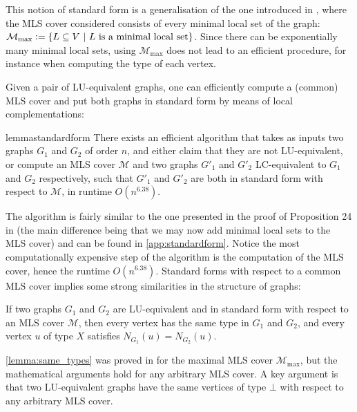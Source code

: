 \documentclass[a4paper,UKenglish,cleveref,autoref,thm-restate]{arxiv}
\newcommand{\defeq}{\vcentcolon=}
\newcommand{\se}{\subseteq}
\begin{document}
\begin{remark}This notion of standard form is a generalisation of the one introduced in \cite{claudet2024local}, where the MLS cover considered consists of every minimal local set of the graph: $\mathcal M_\text{max} \defeq \{L \se V ~|~ L \text{~is a minimal local set}\}$. Since there can be exponentially many minimal local sets, using $\mathcal M_\text{max}$ does not lead to an efficient procedure, for instance when computing the type of each vertex.
\end{remark}

Given a pair of LU-equivalent graphs, one can efficiently compute a (common) MLS cover and put both graphs in standard form by means of local complementations:

\begin{restatable}{lemma}{standardform} \label{lemma:standardform}
    There exists an efficient algorithm that takes as inputs two graphs $G_1$ and $G_2$ of order $n$, and either claim that they are not LU-equivalent, or compute an MLS cover $\mathcal M$ and two graphs $G'_1$ and $G'_2$ LC-equivalent to $G_1$ and $G_2$ respectively, such that $G'_1$ and $G'_2$ are both in standard form with respect to $\mathcal M$, in runtime $O(n^{6.38})$.
\end{restatable}

The algorithm is fairly similar to the one presented in the proof of Proposition 24 in \cite{claudet2024local} (the main difference being that we may now add minimal local sets to the MLS cover) and can be found in \cref{app:standardform}. Notice the most computationally expensive step of the algorithm is the computation of the MLS cover, hence the runtime $O(n^{6.38})$. Standard forms with respect to a common MLS cover implies some strong similarities in the structure of graphs:

\begin{lemma} \label{lemma:same_types}
    If two graphs $G_1$ and $G_2$ are LU-equivalent and in standard form with respect to an MLS cover $\mathcal M$, then every vertex has the same type in $G_1$ and $G_2$, and  every vertex $u$ of type $X$ satisfies $N_{G_1}(u) = N_{G_2}(u)$. 
\end{lemma}

\cref{lemma:same_types} was proved in \cite{claudet2024local} for the maximal MLS cover $\mathcal M_\text{max}$, but the mathematical arguments hold for any arbitrary MLS cover. A key argument is that two LU-equivalent graphs have the same vertices of type $\bot$ with respect to any arbitrary MLS cover. 
\end{document}
